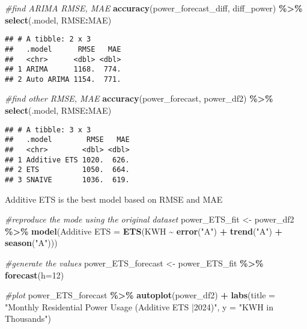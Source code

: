 \documentclass[
]{article}
\newenvironment{Shaded}{\begin{snugshade}}{\end{snugshade}}
\newcommand{\AttributeTok}[1]{\textcolor[rgb]{0.13,0.29,0.53}{#1}}
\newcommand{\CommentTok}[1]{\textcolor[rgb]{0.56,0.35,0.01}{\textit{#1}}}
\newcommand{\DecValTok}[1]{\textcolor[rgb]{0.00,0.00,0.81}{#1}}
\newcommand{\FunctionTok}[1]{\textcolor[rgb]{0.13,0.29,0.53}{\textbf{#1}}}
\newcommand{\NormalTok}[1]{#1}
\newcommand{\OtherTok}[1]{\textcolor[rgb]{0.56,0.35,0.01}{#1}}
\newcommand{\SpecialCharTok}[1]{\textcolor[rgb]{0.81,0.36,0.00}{\textbf{#1}}}
\newcommand{\StringTok}[1]{\textcolor[rgb]{0.31,0.60,0.02}{#1}}
\begin{document}
\begin{Shaded}
\begin{Highlighting}[]
\CommentTok{\#find ARIMA RMSE, MAE}
\FunctionTok{accuracy}\NormalTok{(power\_forecast\_diff, diff\_power) }\SpecialCharTok{\%\textgreater{}\%}
  \FunctionTok{select}\NormalTok{(.model, RMSE}\SpecialCharTok{:}\NormalTok{MAE)}
\end{Highlighting}
\end{Shaded}

\begin{verbatim}
## # A tibble: 2 x 3
##   .model      RMSE   MAE
##   <chr>      <dbl> <dbl>
## 1 ARIMA      1168.  774.
## 2 Auto ARIMA 1154.  771.
\end{verbatim}

\begin{Shaded}
\begin{Highlighting}[]
\CommentTok{\#find other RMSE, MAE}
\FunctionTok{accuracy}\NormalTok{(power\_forecast, power\_df2) }\SpecialCharTok{\%\textgreater{}\%}
  \FunctionTok{select}\NormalTok{(.model, RMSE}\SpecialCharTok{:}\NormalTok{MAE)}
\end{Highlighting}
\end{Shaded}

\begin{verbatim}
## # A tibble: 3 x 3
##   .model        RMSE   MAE
##   <chr>        <dbl> <dbl>
## 1 Additive ETS 1020.  626.
## 2 ETS          1050.  664.
## 3 SNAIVE       1036.  619.
\end{verbatim}

Additive ETS is the best model based on RMSE and MAE

\begin{Shaded}
\begin{Highlighting}[]
\CommentTok{\#reproduce the mode using the original dataset }
\NormalTok{power\_ETS\_fit }\OtherTok{\textless{}{-}}\NormalTok{ power\_df2 }\SpecialCharTok{\%\textgreater{}\%} 
  \FunctionTok{model}\NormalTok{(}\StringTok{\textasciigrave{}}\AttributeTok{Additive ETS}\StringTok{\textasciigrave{}} \OtherTok{=} \FunctionTok{ETS}\NormalTok{(KWH }\SpecialCharTok{\textasciitilde{}} \FunctionTok{error}\NormalTok{(}\StringTok{"A"}\NormalTok{) }\SpecialCharTok{+} \FunctionTok{trend}\NormalTok{(}\StringTok{"A"}\NormalTok{) }\SpecialCharTok{+} \FunctionTok{season}\NormalTok{(}\StringTok{"A"}\NormalTok{)))}

\CommentTok{\#generate the values}
\NormalTok{power\_ETS\_forecast }\OtherTok{\textless{}{-}}\NormalTok{ power\_ETS\_fit }\SpecialCharTok{\%\textgreater{}\%} 
  \FunctionTok{forecast}\NormalTok{(}\AttributeTok{h=}\DecValTok{12}\NormalTok{)}

\CommentTok{\#plot}
\NormalTok{power\_ETS\_forecast }\SpecialCharTok{\%\textgreater{}\%} 
  \FunctionTok{autoplot}\NormalTok{(power\_df2) }\SpecialCharTok{+}
  \FunctionTok{labs}\NormalTok{(}\AttributeTok{title =} \StringTok{"Monthly Residential Power Usage (Additive ETS |2024)"}\NormalTok{,}
       \AttributeTok{y =} \StringTok{"KWH in Thousands"}\NormalTok{)}
\end{Highlighting}
\end{Shaded}
\end{document}
